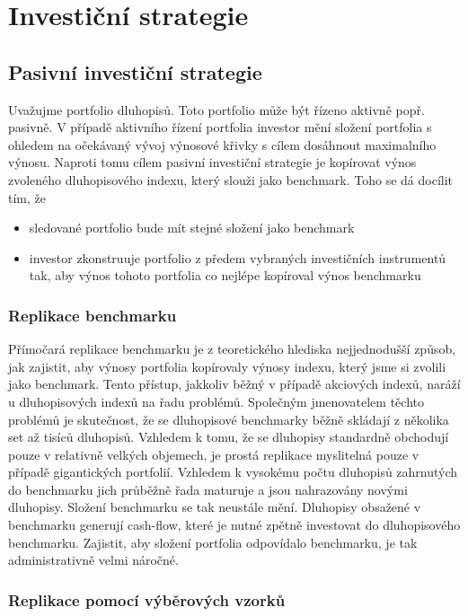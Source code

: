 \documentclass[a4paper]{book}
\begin{document}
\part{Investiční strategie}

\chapter{Pasivní investiční strategie}

Uvažujme portfolio dluhopisů. Toto portfolio může být řízeno aktivně popř. pasivně. V případě aktivního řízení portfolia investor mění složení portfolia s ohledem na očekávaný vývoj výnosové křivky s cílem dosáhnout maximalního výnosu. Naproti tomu cílem pasivní investiční strategie je kopírovat výnos zvoleného dluhopisového indexu, který slouži jako benchmark. Toho se dá docílit tím, že
\begin{itemize}
\item sledované portfolio bude mít stejné složení jako benchmark
\item investor zkonstruuje portfolio z předem vybraných investičních instrumentů tak, aby výnos tohoto portfolia co nejlépe kopíroval výnos benchmarku
\end{itemize}

\section{Replikace benchmarku}

Přímočará replikace benchmarku je z teoretického hlediska nejjednodušší způsob, jak zajistit, aby výnosy portfolia kopírovaly výnosy indexu, který jsme si zvolili jako benchmark. Tento přístup, jakkoliv běžný v případě akciových indexů, naráží u dluhopisových indexů na řadu problémů. Společným jmenovatelem těchto problémů je skutečnost, že se dluhopisové benchmarky běžně skládají z několika set až tisíců dluhopisů. Vzhledem k tomu, že se dluhopisy standardně obchodují pouze v relativně velkých objemech, je prostá replikace myslitelná pouze v případě gigantických portfolií. Vzhledem k vysokému počtu dluhopisů zahrnutých do benchmarku jich průběžně řada maturuje a jsou nahrazovány novými dluhopisy. Složení benchmarku se tak neustále mění. Dluhopisy obsažené v benchmarku generují cash-flow, které je nutné zpětně investovat do dluhopisového benchmarku. Zajistit, aby složení portfolia odpovídalo benchmarku, je tak administrativně velmi náročné.

\section{Replikace pomocí výběrových vzorků}
\end{document}
